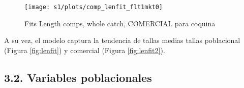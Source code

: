 \documentclass[
]{article}
\begin{document}
\begin{figure}[H]

{\centering \texttt{[image: s1/plots/comp\_lenfit\_flt1mkt0]} 

}

\caption{\label{fig:fitcom}Fits Length comps, whole catch, COMERCIAL para coquina}\label{fig:fitcom}
\end{figure}

A su vez, el modelo captura la tendencia de tallas medias tallas poblacional (Figura \ref{fig:lenfit}) y comercial (Figura \ref{fig:lenfit2}).

\pagebreak

\hypertarget{variables-poblacionales}{%
\subsection{3.2. Variables poblacionales}\label{variables-poblacionales}}
\end{document}
